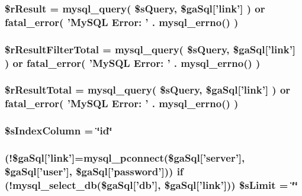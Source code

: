 \hypertarget{jsonp_8php_a8f423fcb1764890d70da997a4140f703}{
\subsubsection[{\$r\+Result}]{\setlength{\rightskip}{0pt plus 5cm}\$r\+Result = mysql\+\_\+query( \$s\+Query, \$ga\+Sql\mbox{[}'link'\mbox{]} ) or {\bf fatal\+\_\+error}( 'My\+S\+Q\+L Error\+: ' . mysql\+\_\+errno() )}}\label{jsonp_8php_a8f423fcb1764890d70da997a4140f703}
\hypertarget{jsonp_8php_a29b3b8a9782e4c5b8157be2ba70a33e1}{
\subsubsection[{\$r\+Result\+Filter\+Total}]{\setlength{\rightskip}{0pt plus 5cm}\$r\+Result\+Filter\+Total = mysql\+\_\+query( \$s\+Query, \$ga\+Sql\mbox{[}'link'\mbox{]} ) or {\bf fatal\+\_\+error}( 'My\+S\+Q\+L Error\+: ' . mysql\+\_\+errno() )}}\label{jsonp_8php_a29b3b8a9782e4c5b8157be2ba70a33e1}
\hypertarget{jsonp_8php_a48722b6bbefe9d4cb748bf0c3f936272}{
\subsubsection[{\$r\+Result\+Total}]{\setlength{\rightskip}{0pt plus 5cm}\$r\+Result\+Total = mysql\+\_\+query( \$s\+Query, \$ga\+Sql\mbox{[}'link'\mbox{]} ) or {\bf fatal\+\_\+error}( 'My\+S\+Q\+L Error\+: ' . mysql\+\_\+errno() )}}\label{jsonp_8php_a48722b6bbefe9d4cb748bf0c3f936272}
\hypertarget{jsonp_8php_a8bddf0b8ded9777b9068de5fa9e217a2}{
\subsubsection[{\$s\+Index\+Column}]{\setlength{\rightskip}{0pt plus 5cm}\$s\+Index\+Column = \char`\"{}id\char`\"{}}}\label{jsonp_8php_a8bddf0b8ded9777b9068de5fa9e217a2}
\hypertarget{jsonp_8php_a867f070c3b4e597275c622aac60de587}{
\subsubsection[{\$s\+Limit}]{ (!\$ga\+Sql\mbox{[}'link'\mbox{]}=mysql\+\_\+pconnect(\$ga\+Sql\mbox{[}'server'\mbox{]}, \$ga\+Sql\mbox{[}'user'\mbox{]}, \$ga\+Sql\mbox{[}'password'\mbox{]})) {\bf if} (!mysql\+\_\+select\+\_\+db(\$ga\+Sql\mbox{[}'db'\mbox{]}, \$ga\+Sql\mbox{[}'link'\mbox{]})) \$s\+Limit = \char`\"{}\char`\"{}}}\label{jsonp_8php_a867f070c3b4e597275c622aac60de587}
